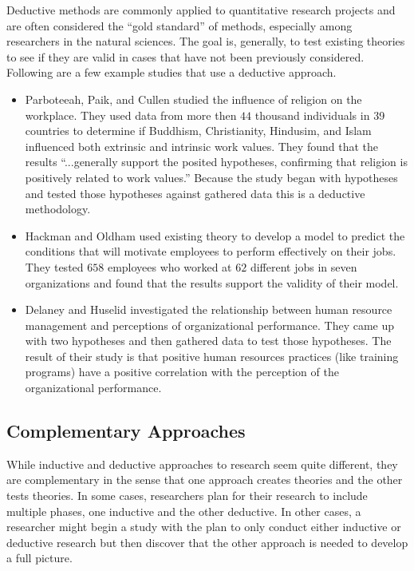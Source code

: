 Deductive methods are commonly applied to quantitative research projects and are often considered the ``gold standard'' of methods, especially among researchers in the natural sciences. The goal is, generally, to test existing theories to see if they are valid in cases that have not been previously considered. Following are a few example studies that use a deductive approach.

\begin{itemize}
	\item Parboteeah, Paik, and Cullen\cite{parboteeah2009religious} studied the influence of religion on the workplace. They used data from more then $ 44 $ thousand individuals in 39 countries to determine if Buddhism, Christianity, Hindusim, and Islam influenced both extrinsic and intrinsic work values. They found that the results ``...generally support the posited hypotheses, confirming that religion is positively related to work values.'' Because the study began with hypotheses and tested those hypotheses against gathered data this is a deductive methodology.

	\item Hackman and Oldham\cite{hackman1976motivation} used existing theory to develop a model to predict the conditions that will motivate employees to perform effectively on their jobs. They tested $ 658 $ employees who worked at $ 62 $ different jobs in seven organizations and found that the results support the validity of their model.

	\item Delaney and Huselid\cite{delaney1996impact} investigated the relationship between human resource management and perceptions of organizational performance. They came up with two hypotheses and then gathered data to test those hypotheses. The result of their study is that positive human resources practices (like training programs) have a positive correlation with the perception of the organizational performance. 
\end{itemize}

\subsection{Complementary Approaches}

While inductive and deductive approaches to research seem quite different, they are complementary in the sense that one approach creates theories and the other tests theories. In some cases, researchers plan for their research to include multiple phases, one inductive and the other deductive. In other cases, a researcher might begin a study with the plan to only conduct either inductive or deductive research but then discover that the other approach is needed to develop a full picture.

